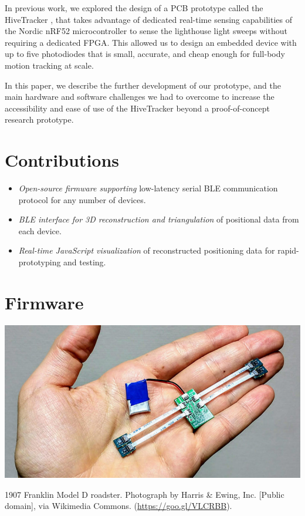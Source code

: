 \documentclass[sigchi-a]{acmart}
\begin{document}
In previous work, we explored the design of a PCB prototype called the HiveTracker \cite{Quinones2018}, that takes advantage of dedicated real-time sensing capabilities of the Nordic nRF52 microcontroller to sense the lighthouse light sweeps without requiring a dedicated FPGA. This allowed us to design an embedded device with up to five photodiodes that is small, accurate, and cheap enough for full-body motion tracking at scale.

In this paper, we describe the further development of our prototype, and the main hardware and software challenges we had to overcome to increase the accessibility and ease of use of the HiveTracker beyond a proof-of-concept research prototype.

\section{Contributions}

\begin{itemize}
  \item {\itshape Open-source firmware supporting} low-latency serial BLE communication protocol for any number of devices.
  \item {\itshape BLE interface for 3D reconstruction and triangulation} of positional data from each device.
  \item {\itshape Real-time JavaScript visualization} of reconstructed positioning data for rapid-prototyping and testing.
\end{itemize}

\section{Firmware}

\begin{marginfigure}
  \centering
  \includegraphics[width=\linewidth]{prototype}
  \caption{1907 Franklin Model D roadster. Photograph by Harris \&
    Ewing, Inc. [Public domain], via Wikimedia
    Commons. (\url{https://goo.gl/VLCRBB}).}
\end{marginfigure}
\end{document}
